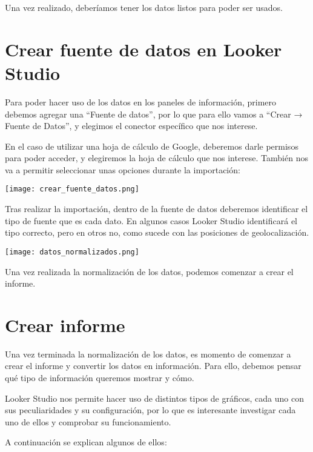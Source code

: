 Una vez realizado, deberíamos tener los datos listos para poder ser usados.

\section{Crear fuente de datos en Looker Studio}

Para poder hacer uso de los datos en los paneles de información, primero debemos agregar una “Fuente de datos”, por lo que para ello vamos a “Crear → Fuente de Datos”, y elegimos el conector específico que nos interese.

En el caso de utilizar una hoja de cálculo de Google, deberemos darle permisos para poder acceder, y elegiremos la hoja de cálculo que nos interese. También nos va a permitir seleccionar unas opciones durante la importación:

\begin{center}
    \texttt{[image: crear\_fuente\_datos.png]}
\end{center}

Tras realizar la importación, dentro de la fuente de datos deberemos identificar el tipo de fuente que es cada dato. En algunos casos Looker Studio identificará el tipo correcto, pero en otros no, como sucede con las posiciones de geolocalización.

\begin{center}
    \texttt{[image: datos\_normalizados.png]}
\end{center}

Una vez realizada la normalización de los datos, podemos comenzar a crear el informe.


\section{Crear informe}

Una vez terminada la normalización de los datos, es momento de comenzar a crear el informe y convertir los datos en información. Para ello, debemos pensar qué tipo de información queremos mostrar y cómo.

Looker Studio nos permite hacer uso de distintos tipos de gráficos, cada uno con sus peculiaridades y su configuración, por lo que es interesante investigar cada uno de ellos y comprobar su funcionamiento.

A continuación se explican algunos de ellos:


